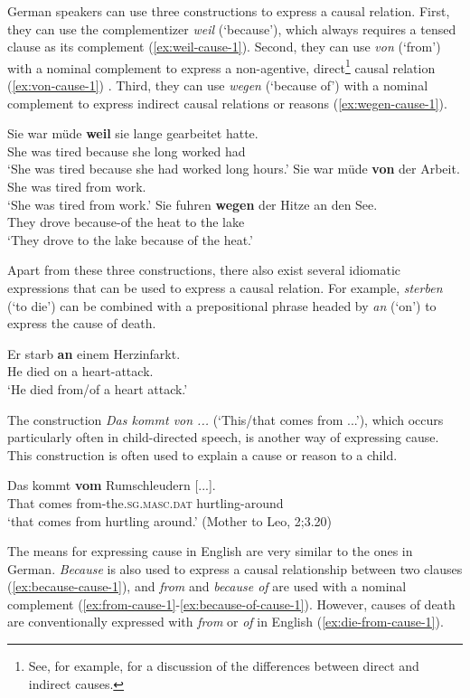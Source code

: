 \documentclass[lucida]{sp} %
\begin{document}
German speakers can use three constructions to express a causal relation. First, they can use the complementizer \textit{weil} (`{because}'), which always requires a tensed clause as its complement (\ref{ex:weil-cause-1}). Second, they can use \textit{von} (`{from}') with a nominal complement to express a non-agentive, direct\footnote{See, for example, \cite{wolff2003} for a discussion of the differences between direct and indirect causes.} causal relation (\ref{ex:von-cause-1}) \citep{maienborn2015}.  Third, they can use \textit{wegen} (`{because of}') with a nominal complement to express indirect causal relations or reasons (\ref{ex:wegen-cause-1}).
\begin{exe}
\ex \label{ex:weil-cause-1}\gll Sie war müde \textbf{weil} sie lange gearbeitet hatte.\\
She was tired because she long worked had \\
`She was tired because she had worked long hours.'
\ex  \label{ex:von-cause-1} \gll Sie war müde \textbf{von} der Arbeit.\\
She was tired from work. \\
`She was tired from work.'
\ex  \label{ex:wegen-cause-1} \gll Sie fuhren \textbf{wegen} der Hitze an den See. \\
They drove because-of the heat to the lake \\
`They drove to the lake because of the heat.'
\end{exe}
Apart from these three constructions, there also exist several idiomatic expressions that can be used to express a causal relation. For example, \textit{sterben} (`to die') can be combined with a prepositional phrase headed by \textit{an} (`on') to express the cause of death.

\begin{exe}
\ex \label{ex:sterben-an-cause-1}\gll Er starb \textbf{an} einem Herzinfarkt.\\
He died on a heart-attack. \\
`He died from/of a heart attack.'
\end{exe}
The construction \textit{Das kommt von ...} (`This/that comes from ...'), which occurs particularly often in child-directed speech,  is another way of expressing cause. This construction is often used to explain a cause or reason to a child.

\begin{exe}
\ex \label{ex:kommt-von-an-cause-1}\gll Das kommt \textbf{vom} Rumschleudern [...].\\
That comes from-the.\textsc{sg}.\textsc{masc}.\textsc{dat} hurtling-around \\
`that comes from hurtling around.'  \hfill (Mother to Leo, 2;3.20)
\end{exe}
The means for expressing cause in English are very similar to the ones in German. \textit{Because} is also used to express a causal relationship between two clauses (\ref{ex:because-cause-1}), and \textit{from} and \textit{because of} are used with a nominal complement (\ref{ex:from-cause-1}-\ref{ex:because-of-cause-1}). However, causes of death are conventionally expressed with \textit{from} or \textit{of} in English (\ref{ex:die-from-cause-1}).
\end{document}
